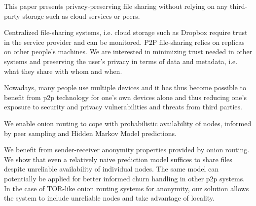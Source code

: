 
This paper presents privacy-preserving file sharing without relying on any third-party storage such as cloud services or peers. 

Centralized file-sharing systems, i.e. cloud storage such as Dropbox require trust in the service provider and can be monitored. P2P file-sharing relies on replicas on other people's machines. We are interested in minimizing trust needed in other systems and preserving the user's privacy in terms of data and metadata, i.e. what they share with whom and when.

Nowadays, many people use multiple devices and it has thus become possible to benefit from p2p technology for one's own devices alone and thus reducing one's exposure to security and privacy vulnerabilities and threats from third parties.

We enable onion routing to cope with probabilistic availability of nodes, informed by peer sampling and Hidden Markov Model predictions.

We benefit from sender-receiver anonymity properties provided by onion routing. We show that even a relatively naive prediction model suffices to share files despite unreliable availability of individual nodes. The same model can potentially be applied for better informed churn handling in other p2p systems. In the case of TOR-like onion routing systems for anonymity, our solution allows the system to include unreliable nodes and take advantage of locality. 

